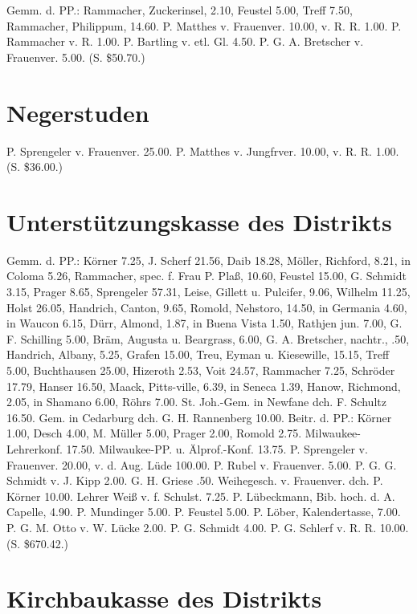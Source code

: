 Gemm. d. PP.: Rammacher, Zuckerinsel, 2.10, Feustel 5.00, Treff 7.50, Rammacher, Philippum, 14.60. P. Matthes v. Frauenver. 10.00, v. R. R. 1.00. P. Rammacher v. R. 1.00. P. Bartling v. etl. Gl. 4.50. P. G. A. Bretscher v. Frauenver. 5.00. (S. \$50.70.)

\section{Negerstuden}

P. Sprengeler v. Frauenver. 25.00. P. Matthes v. Jungfrver. 10.00, v. R. R. 1.00. (S. \$36.00.)

\section{Unterstützungskasse des Distrikts}

Gemm. d. PP.: Körner 7.25, J. Scherf 21.56, Daib 18.28, Möller, Richford, 8.21, in Coloma 5.26, Rammacher, spec. f. Frau P. Plaß, 10.60, Feustel 15.00, G. Schmidt 3.15, Prager 8.65, Sprengeler 57.31, Leise, Gillett u. Pulcifer, 9.06, Wilhelm 11.25, Holst 26.05, Handrich, Canton, 9.65, Romold, Nehstoro, 14.50, in Germania 4.60, in Waucon 6.15, Dürr, Almond, 1.87, in Buena Vista 1.50, Rathjen jun. 7.00, G. F. Schilling 5.00, Bräm, Augusta u. Beargrass, 6.00, G. A. Bretscher, nachtr., .50, Handrich, Albany, 5.25, Grafen 15.00, Treu, Eyman u. Kiesewille, 15.15, Treff 5.00, Buchthausen 25.00, Hizeroth 2.53, Voit 24.57, Rammacher 7.25, Schröder 17.79, Hanser 16.50, Maack, Pitts-ville, 6.39, in Seneca 1.39, Hanow, Richmond, 2.05, in Shamano 6.00, Röhrs 7.00. St. Joh.-Gem. in Newfane dch. F. Schultz 16.50. Gem. in Cedarburg dch. G. H. Rannenberg 10.00. Beitr. d. PP.: Körner 1.00, Desch 4.00, M. Müller 5.00, Prager 2.00, Romold 2.75. Milwaukee-Lehrerkonf. 17.50. Milwaukee-PP. u. Älprof.-Konf. 13.75. P. Sprengeler v. Frauenver. 20.00, v. d. Aug. Lüde 100.00. P. Rubel v. Frauenver. 5.00. P. G. G. Schmidt v. J. Kipp 2.00. G. H. Griese .50. Weihegesch. v. Frauenver. dch. P. Körner 10.00. Lehrer Weiß v. f. Schulst. 7.25. P. Lübeckmann, Bib. hoch. d. A. Capelle, 4.90. P. Mundinger 5.00. P. Feustel 5.00. P. Löber, Kalendertasse, 7.00. P. G. M. Otto v. W. Lücke 2.00. P. G. Schmidt 4.00. P. G. Schlerf v. R. R. 10.00. (S. \$670.42.)

\section{Kirchbaukasse des Distrikts}

